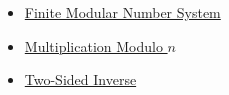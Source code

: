 \begin{dependencies}
\begin{itemize}
  \item \hyperref[def:finite-modular-number-system]{Finite Modular Number System}
  \item \hyperref[def:multiplication-modulo-n]{Multiplication Modulo \(n\)}
  \item \hyperref[def:two-sided-inverse]{Two-Sided Inverse}
\end{itemize}
\end{dependencies}
